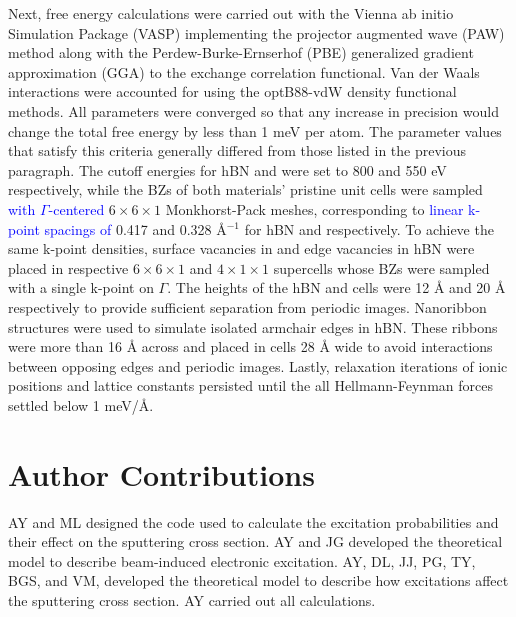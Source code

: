 \documentclass[twoside,twocolumn,9pt]{article}
\begin{document}
Next, free energy calculations were carried out with the Vienna ab initio
Simulation Package (VASP) \cite{Kresse1996, Kresse1996a} implementing the
projector augmented wave (PAW) method \cite{Blochl1994} along with the
Perdew-Burke-Ernserhof (PBE) generalized gradient approximation (GGA) to the
exchange correlation functional. \cite{Perdew1996}
Van der Waals interactions were accounted for using the optB88-vdW density
functional methods. \cite{Klimes2010, Klimes2011}
All parameters were converged so that any increase in precision would change
the total free energy by less than 1 meV per atom.
The parameter values that satisfy this criteria generally differed from
those listed in the previous paragraph.
The cutoff energies for hBN and  were set to 800 and 550 eV
respectively, while the BZs of both materials' pristine unit cells were sampled
\textcolor{blue}{with $\Gamma$-centered} $6\times6\times1$ Monkhorst-Pack meshes,
\cite{Monkhorst1976} corresponding to \textcolor{blue}{linear k-point spacings
of} 0.417 and 0.328 {\AA}$^{-1}$ for hBN and  respectively.
To achieve the same k-point densities, surface vacancies in  and edge
vacancies in hBN were placed in respective $6\times6\times1$ and
$4\times1\times1$ supercells whose BZs were sampled with a single k-point on
$\Gamma$.
The heights of the hBN and  cells were 12 {\AA} and 20 {\AA}
respectively to provide sufficient separation from periodic images.
Nanoribbon structures were used to simulate isolated armchair edges in hBN.
These ribbons were more than 16 {\AA} across and placed in cells 28 {\AA} wide
to avoid interactions between opposing edges and periodic images.
Lastly, relaxation iterations of ionic positions and lattice constants
persisted until the all Hellmann-Feynman forces settled below 1 
meV/{\AA}.

\section*{Author Contributions}
\label{sec:contributions}

AY and ML designed the code used to calculate the excitation probabilities and
their effect on the sputtering cross section.
AY and JG developed the theoretical model to describe beam-induced electronic
excitation.
AY, DL, JJ, PG, TY, BGS, and VM, developed the theoretical model to describe how
excitations affect the sputtering cross section.
AY carried out all calculations.
\end{document}
